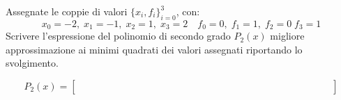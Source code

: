 Assegnate le coppie di valori $\{x_i,f_i \}_{i=0}^3$, con:
\[ x_0=-2, \; x_1=-1, \; x_2=1, \; x_3=2 \quad f_0=0, \; f_1=1, \; f_2=0 \; f_3=1 \]
\noindent Scrivere l'espressione del polinomio di secondo grado $P_2(x)$  
migliore approssimazione ai minimi quadrati dei valori
assegnati riportando lo svolgimento. 
\vspace*{5cm}

\[
P_2(x)=\left [
\begin{array}{cccccccccccccc}
\quad &  \quad & \quad &  \quad &  \quad &  \quad &  \quad  \quad & \quad &  \quad & \quad &  \quad & \quad & \quad &  \quad  \\
\quad &  \quad & \quad &  \quad &  \quad &  \quad &  \quad  \quad & \quad &  \quad & \quad &  \quad & \quad & \quad &  \quad \\
\quad &  \quad & \quad &  \quad &  \quad &  \quad &  \quad  \quad 
& \quad &  \quad & \quad &  \quad & \quad & \quad &  \quad
\end{array}\right]
\]
